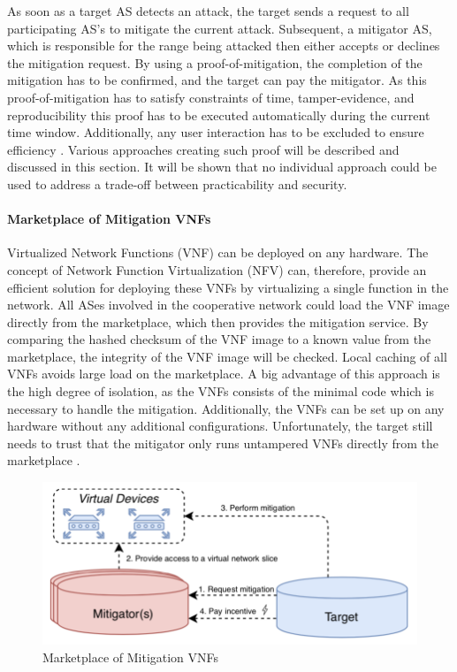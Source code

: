 As soon as a target AS detects an attack, the target sends a request to all participating AS's to mitigate the current attack. Subsequent, a mitigator AS, which is responsible for the range being attacked then either accepts or declines the mitigation request. By using a proof-of-mitigation, the completion of the mitigation has to be confirmed, and the target can pay the mitigator. As this proof-of-mitigation has to satisfy constraints of time, tamper-evidence, and reproducibility this proof has to be executed automatically during the current time window. Additionally, any user interaction has to be excluded to ensure efficiency \cite{Mannhart2018}. Various approaches creating such proof will be described and discussed in this section. It will be shown that no individual approach could be used to address a trade-off between practicability and security.

\paragraph{Marketplace of Mitigation VNFs}
Virtualized  Network Functions (VNF) can be deployed on any hardware. The concept of Network Function Virtualization (NFV) can, therefore, provide an efficient solution for deploying these VNFs by virtualizing a single function in the network. All ASes involved in the cooperative network could load the VNF image directly from the marketplace, which then provides the mitigation service. By comparing the hashed checksum of the VNF image to a known value from the marketplace, the integrity of the VNF image will be checked. Local caching of all VNFs avoids large load on the marketplace. A big advantage of this approach is the high degree of isolation, as the VNFs consists of the minimal code which is necessary to handle the mitigation. Additionally, the VNFs can be set up on any hardware without any additional configurations. Unfortunately, the target still needs to trust that the mitigator only runs untampered VNFs directly from the marketplace \cite{Mannhart2018}.
\begin{figure}[ht]
  \begin{center}
  \includegraphics[scale=0.5]{Talk7/img/ddos/cooperative_network_marketplace_vnfs}
  \end{center}
  \caption{Marketplace of Mitigation VNFs}
  \label{ddos_marketplace_vnf}
\end{figure}

